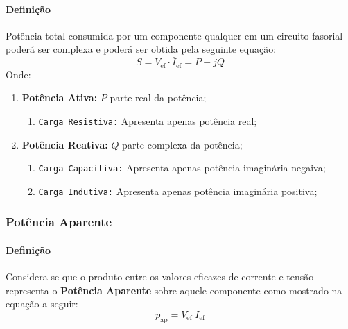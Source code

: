\documentclass{article}
\begin{document}
                \paragraph{Definição}Potência total consumida por um componente qualquer em um circuito fasorial poderá ser complexa e poderá ser obtida pela seguinte equação:
                    \begin{equation}
                        \boxed{
                            S = V_{\text{ef}} \cdot \bar{I}_{\text{ef}} = P + jQ
                        }
                    \end{equation}
                Onde:
                    \begin{enumerate}
                        \item \textbf{Potência Ativa:} $P$ parte real da potência;
                            \begin{enumerate}[noitemsep]
                                \item \texttt{Carga Resistiva:} Apresenta apenas potência real;
                            \end{enumerate}

                        \item \textbf{Potência Reativa:} $Q$ parte complexa da potência;
                            \begin{enumerate}[noitemsep]
                                \item \texttt{Carga Capacitiva:} Apresenta apenas potência imaginária negaiva;
                                \item \texttt{Carga Indutiva:} Apresenta apenas potência imaginária positiva;
                            \end{enumerate}
                    \end{enumerate}

            \subsubsection{Potência Aparente}
                \paragraph{Definição}Considera-se que o produto entre os valores eficazes de corrente e tensão representa o \textbf{Potência Aparente} sobre aquele componente como mostrado na equação a seguir:
                    \begin{equation}
                        \boxed{p_{\text{ap}} = V_{\text{ef}}\;I_{\text{ef}}}
                    \end{equation}
\end{document}
